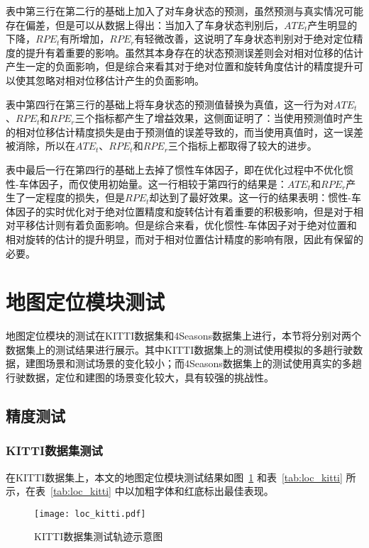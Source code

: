 表中第三行在第二行的基础上加入了对车身状态的预测，虽然预测与真实情况可能存在偏差，但是可以从数据上得出：当加入了车身状态判别后，$ATE_t$产生明显的下降，$RPE_t$有所增加，$RPE_r$有轻微改善，这说明了车身状态判别对于绝对定位精度的提升有着重要的影响。虽然其本身存在的状态预测误差则会对相对位移的估计产生一定的负面影响，但是综合来看其对于绝对位置和旋转角度估计的精度提升可以使其忽略对相对位移估计产生的负面影响。

表中第四行在第三行的基础上将车身状态的预测值替换为真值，这一行为对$ATE_t$、$RPE_t$和$RPE_r$三个指标都产生了增益效果，这侧面证明了：当使用预测值时产生的相对位移估计精度损失是由于预测值的误差导致的，而当使用真值时，这一误差被消除，所以在$ATE_t$、$RPE_t$和$RPE_r$三个指标上都取得了较大的进步。

表中最后一行在第四行的基础上去掉了惯性车体因子，即在优化过程中不优化惯性-车体因子，而仅使用初始量。这一行相较于第四行的结果是：$ATE_t$和$RPE_r$产生了一定程度的损失，但是$RPE_t$却达到了最好效果。这一行的结果表明：惯性-车体因子的实时优化对于绝对位置精度和旋转估计有着重要的积极影响，但是对于相对平移估计则有着负面影响。但是综合来看，优化惯性-车体因子对于绝对位置和相对旋转的估计的提升明显，而对于相对位置估计精度的影响有限，因此有保留的必要。

\section{地图定位模块测试}
地图定位模块的测试在KITTI数据集和4Seasons数据集上进行，本节将分别对两个数据集上的测试结果进行展示。其中KITTI数据集上的测试使用模拟的多趟行驶数据，建图场景和测试场景的变化较小；而4Seasons数据集上的测试使用真实的多趟行驶数据，定位和建图的场景变化较大，具有较强的挑战性。

\subsection{精度测试}
\subsubsection{KITTI数据集测试}
在KITTI数据集上，本文的地图定位模块测试结果如图~\ref{fig:loc_kitti} 和表~\ref{tab:loc_kitti} 所示，在表~\ref{tab:loc_kitti} 中以加粗字体和红底标出最佳表现。

\begin{figure}
  \centering
  \texttt{[image: loc\_kitti.pdf]}
  \caption{KITTI数据集测试轨迹示意图}
  \label{fig:loc_kitti}
\end{figure}

